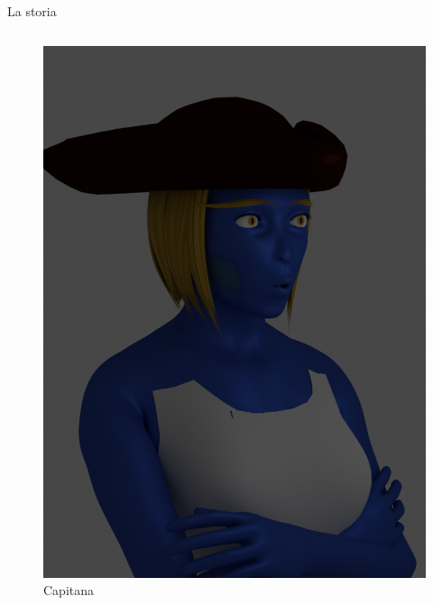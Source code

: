 \documentclass[10pt]{beamer}
\begin{document}
\begin{frame}[fragile]{La storia}
\begin{columns}[T,onlytextwidth]
      \begin{figure}
          \centering
          \includegraphics[width=\textwidth]{figures/Capitana.png}
          \caption{Capitana}
      \end{figure}
  \end{columns}
\end{frame}
\end{document}

